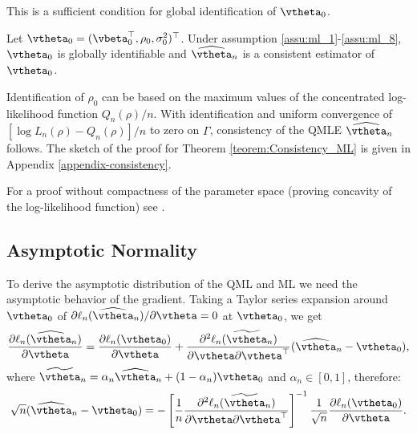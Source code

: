 \documentclass[english,12pt]{book}\usepackage[]{graphicx}\usepackage[]{xcolor}
\begin{document}
This is a sufficient condition for global identification of $\vtheta_0$.

\begin{theorem}[Consistency]\label{teorem:Consistency_ML}
	Let $\vtheta_0 = (\vbeta_0^\top, \rho_0, \sigma_0^2)^\top$. Under assumption \ref{assu:ml_1}-\ref{assu:ml_8}, $\vtheta_0$ is globally identifiable and $\widehat{\vtheta}_n$ is a consistent estimator of $\vtheta_0$.
\end{theorem}


Identification of $\rho_0$ can be based on the maximum values of the concentrated log-likelihood function $Q_n(\rho) / n$. With identification and uniform convergence of $\left[\log L_n(\rho) - Q_n(\rho)\right] / n$ to zero on $\Gamma$, consistency of the QMLE $\widehat{\vtheta}_n$ follows. The sketch of the proof for Theorem \ref{teorem:Consistency_ML} is given in Appendix \ref{appendix-consistency}. 

For a proof without compactness of the parameter space (proving concavity of the log-likelihood function) see \cite{liu2022consistency}.

\subsection{Asymptotic Normality}

To derive the asymptotic distribution of the QML and ML we need the asymptotic behavior of the gradient. Taking a Taylor series expansion around $\vtheta_0$ of $\partial \ell_n(\widehat{\vtheta}_n)/ \partial \vtheta = 0$ at $\vtheta_0$, we get
\begin{equation*}
  \frac{\partial \ell_n(\widehat{\vtheta}_n)}{\partial \vtheta} =  \frac{\partial \ell_n(\vtheta_0)}{\partial \vtheta} + \frac{\partial^2 \ell_n(\widetilde{\vtheta}_n)}{\partial \vtheta \partial \vtheta^\top}(\widehat{\vtheta}_n - \vtheta_0),
\end{equation*}
%
where $\widetilde{\vtheta}_n = \alpha_n \widehat{\vtheta}_n + (1 - \alpha_n)\vtheta_0$ and $\alpha_n\in \left[ 0, 1\right]$, therefore:
\begin{equation}\label{eq:sampling-error-ml}
  \sqrt{n}(\widehat{\vtheta}_n - \vtheta_0) = - \left[\frac{1}{n}\frac{\partial^2 \ell_n(\widetilde{\vtheta}_n)}{\partial \vtheta \partial \vtheta^\top}\right]^{-1}\frac{1}{\sqrt{n}}\frac{\partial \ell_n(\vtheta_0)}{\partial \vtheta}.
\end{equation}
\end{document}
